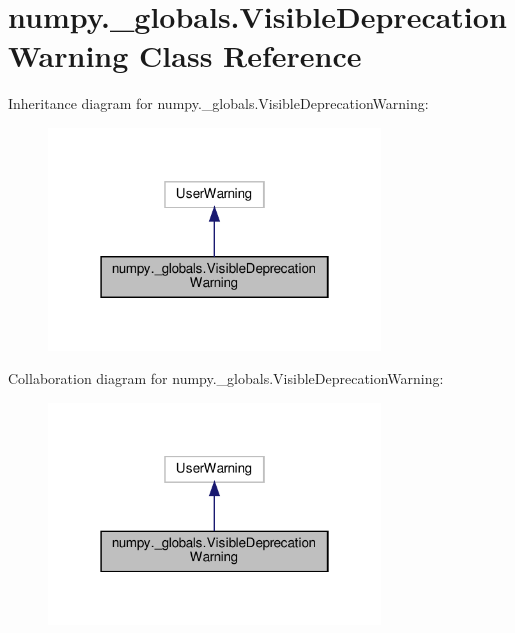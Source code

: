 \hypertarget{classnumpy_1_1__globals_1_1VisibleDeprecationWarning}{}\section{numpy.\+\_\+globals.\+Visible\+Deprecation\+Warning Class Reference}
\label{classnumpy_1_1__globals_1_1VisibleDeprecationWarning}


Inheritance diagram for numpy.\+\_\+globals.\+Visible\+Deprecation\+Warning\+:
\nopagebreak
\begin{figure}[H]
\begin{center}
\leavevmode
\includegraphics[width=250pt]{classnumpy_1_1__globals_1_1VisibleDeprecationWarning__inherit__graph}
\end{center}
\end{figure}


Collaboration diagram for numpy.\+\_\+globals.\+Visible\+Deprecation\+Warning\+:
\nopagebreak
\begin{figure}[H]
\begin{center}
\leavevmode
\includegraphics[width=250pt]{classnumpy_1_1__globals_1_1VisibleDeprecationWarning__coll__graph}
\end{center}
\end{figure}


